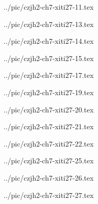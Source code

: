 

../pic/czjh2-ch7-xiti27-11.tex



../pic/czjh2-ch7-xiti27-13.tex



../pic/czjh2-ch7-xiti27-14.tex



../pic/czjh2-ch7-xiti27-15.tex



../pic/czjh2-ch7-xiti27-17.tex



../pic/czjh2-ch7-xiti27-19.tex



../pic/czjh2-ch7-xiti27-20.tex



../pic/czjh2-ch7-xiti27-21.tex



../pic/czjh2-ch7-xiti27-22.tex



../pic/czjh2-ch7-xiti27-25.tex



../pic/czjh2-ch7-xiti27-26.tex



../pic/czjh2-ch7-xiti27-27.tex

